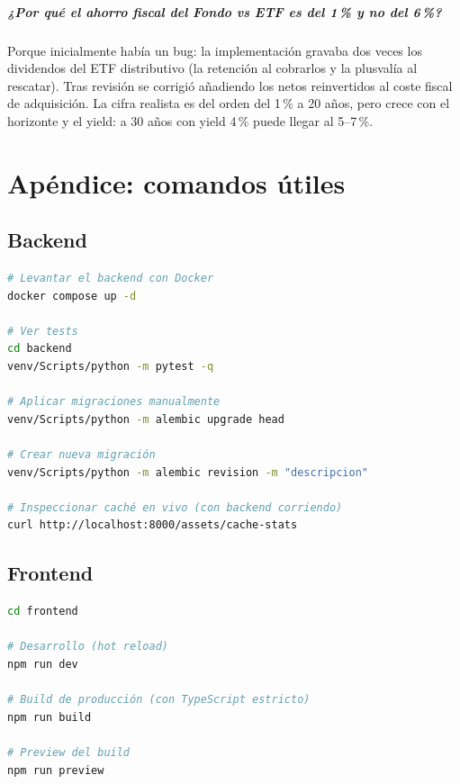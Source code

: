 \documentclass[11pt,a4paper]{book}
\begin{document}
\paragraph{¿Por qué el ahorro fiscal del Fondo vs ETF es del 1\,\% y no del 6\,\%?}
Porque inicialmente había un bug: la implementación gravaba dos veces los dividendos del ETF distributivo (la retención al cobrarlos y la plusvalía al rescatar). Tras revisión se corrigió añadiendo los netos reinvertidos al coste fiscal de adquisición. La cifra realista es del orden del 1\,\% a 20 años, pero crece con el horizonte y el yield: a 30 años con yield 4\,\% puede llegar al 5--7\,\%.

\chapter{Apéndice: comandos útiles}

\section{Backend}

\begin{lstlisting}[language=bash]
# Levantar el backend con Docker
docker compose up -d

# Ver tests
cd backend
venv/Scripts/python -m pytest -q

# Aplicar migraciones manualmente
venv/Scripts/python -m alembic upgrade head

# Crear nueva migración
venv/Scripts/python -m alembic revision -m "descripcion"

# Inspeccionar caché en vivo (con backend corriendo)
curl http://localhost:8000/assets/cache-stats
\end{lstlisting}

\section{Frontend}

\begin{lstlisting}[language=bash]
cd frontend

# Desarrollo (hot reload)
npm run dev

# Build de producción (con TypeScript estricto)
npm run build

# Preview del build
npm run preview
\end{lstlisting}
\end{document}
